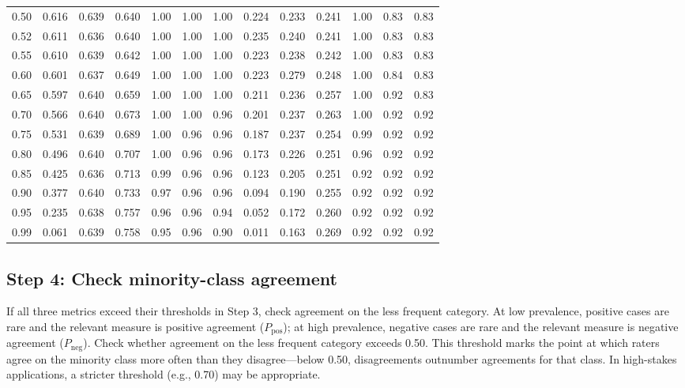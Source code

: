 \documentclass[11pt]{article}
\begin{document}
\begin{table}[h!]
\begin{tabular}{c | >{\columncolor{green!10}}c >{\columncolor{green!10}}c >{\columncolor{green!10}}c | c c c | >{\columncolor{yellow!15}}c >{\columncolor{yellow!15}}c >{\columncolor{yellow!15}}c | c c c}
0.50 & 0.616 & 0.639 & 0.640 & 1.00 & 1.00 & 1.00 & 0.224 & 0.233 & 0.241 & 1.00 & 0.83 & 0.83 \\
0.52 & 0.611 & 0.636 & 0.640 & 1.00 & 1.00 & 1.00 & 0.235 & 0.240 & 0.241 & 1.00 & 0.83 & 0.83 \\
0.55 & 0.610 & 0.639 & 0.642 & 1.00 & 1.00 & 1.00 & 0.223 & 0.238 & 0.242 & 1.00 & 0.83 & 0.83 \\
0.60 & 0.601 & 0.637 & 0.649 & 1.00 & 1.00 & 1.00 & 0.223 & 0.279 & 0.248 & 1.00 & 0.84 & 0.83 \\
0.65 & 0.597 & 0.640 & 0.659 & 1.00 & 1.00 & 1.00 & 0.211 & 0.236 & 0.257 & 1.00 & 0.92 & 0.83 \\
0.70 & 0.566 & 0.640 & 0.673 & 1.00 & 1.00 & 0.96 & 0.201 & 0.237 & 0.263 & 1.00 & 0.92 & 0.92 \\
0.75 & 0.531 & 0.639 & 0.689 & 1.00 & 0.96 & 0.96 & 0.187 & 0.237 & 0.254 & 0.99 & 0.92 & 0.92 \\
0.80 & 0.496 & 0.640 & 0.707 & 1.00 & 0.96 & 0.96 & 0.173 & 0.226 & 0.251 & 0.96 & 0.92 & 0.92 \\
0.85 & 0.425 & 0.636 & 0.713 & 0.99 & 0.96 & 0.96 & 0.123 & 0.205 & 0.251 & 0.92 & 0.92 & 0.92 \\
0.90 & 0.377 & 0.640 & 0.733 & 0.97 & 0.96 & 0.96 & 0.094 & 0.190 & 0.255 & 0.92 & 0.92 & 0.92 \\
0.95 & 0.235 & 0.638 & 0.757 & 0.96 & 0.96 & 0.94 & 0.052 & 0.172 & 0.260 & 0.92 & 0.92 & 0.92 \\
0.99 & 0.061 & 0.639 & 0.758 & 0.95 & 0.96 & 0.90 & 0.011 & 0.163 & 0.269 & 0.92 & 0.92 & 0.92 \\
\bottomrule
\end{tabular}
\end{table}


\subsection*{Step 4: Check minority-class agreement}

If all three metrics exceed their thresholds in Step 3, check agreement on the less frequent category. At low prevalence, positive cases are rare and the relevant measure is positive agreement ($P_{\text{pos}}$); at high prevalence, negative cases are rare and the relevant measure is negative agreement ($P_{\text{neg}}$). Check whether agreement on the less frequent category exceeds 0.50. This threshold marks the point at which raters agree on the minority class more often than they disagree---below 0.50, disagreements outnumber agreements for that class. In high-stakes applications, a stricter threshold (e.g., 0.70) may be appropriate.
\end{document}
